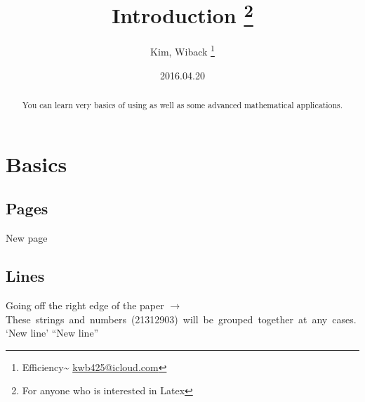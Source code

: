 \documentclass[12pt, oneside]{article}
\title{\LaTeXe{} Introduction \thanks{For anyone who is interested in Latex}} %
\author{Kim, Wiback \thanks{Efficiency\~{} \href{mailto:kwb425@icloud.com}{kwb425@icloud.com}}}
\date{2016.04.20}
\begin{document}
\maketitle
\tableofcontents \label{toc}



\begin{abstract} 
You can learn very basics of using \LaTeXe as well as some advanced mathematical applications.
\end{abstract}



\section{Basics} %



\newpage
\subsection{Pages}
New page



\subsection{Lines} %
Going off the right edge of the paper $\to$ \mbox{These strings and numbers (21312903) will be grouped together at any cases.} %
\newline
`New line' %
\newline
``New line'' %
\end{document}

